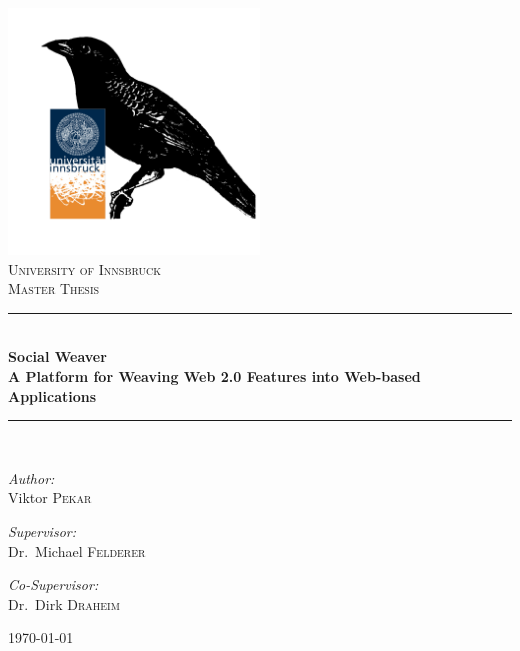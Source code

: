 \documentclass[12pt, twoside]{article}
\newcommand{\HRule}{\rule{\linewidth}{0.5mm}}
\begin{document}
\begin{titlepage}
\begin{center}


\includegraphics[width=0.5\textwidth]{images/sowebird+uibk.png}~\\[1cm]

\textsc{\LARGE University of Innsbruck}\\[1.5cm]

\textsc{\Large Master Thesis}\\[0.5cm]

\HRule\\[0.4cm]
{ \huge \bfseries Social Weaver\\[0.2cm]
\large A Platform for Weaving Web 2.0 Features into Web-based Applications}\\[0.4cm]

\HRule \\[1.5cm]

\begin{minipage}{0.4\textwidth}
\begin{flushleft} \large
\emph{Author:}\\
Viktor \textsc{Pekar}
\end{flushleft}
\end{minipage}
\begin{minipage}{0.4\textwidth}
\begin{flushright} \large
\emph{Supervisor:} \\
Dr.~Michael \textsc{Felderer}
\end{flushright}
\begin{flushright} \large
\emph{Co-Supervisor:} \\
Dr.~Dirk \textsc{Draheim}
\end{flushright}
\end{minipage}
\vfill

{\large \today}

\end{center}
\end{titlepage}
\end{document}

